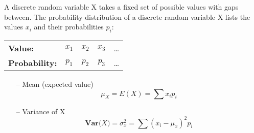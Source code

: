 \documentclass{article}
\begin{document}
\noindent
A discrete random variable X takes a fixed set of possible values with gaps between. The probability distribution of a discrete random variable X lists the values $x_i$ and their probabilities $p_i$:
\begin{table}[H]
\centering
\begin{tabular}{lcccc}
    \hline
    \textbf{Value:} & $x_1$ & $x_2$ & $x_3$ & \ldots\\
    \textbf{Probability:} & $p_1$ & $p_2$ & $p_3$ & \ldots\\
    \hline
\end{tabular}
\end{table}

\begin{itemize}
    \item[--] Mean (expected value)
\begin{equation*}
    \mu_X = E(X) = \sum x_i p_i
\end{equation*}
    \item[--] Variance of X
\begin{equation*}
    \textbf{Var(}X\textbf{)} = \sigma^2_x = \sum (x_i - \mu_x)^2 p_i
\end{equation*}

\end{itemize}
\end{document}

